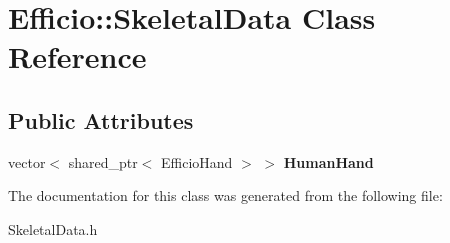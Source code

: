 \hypertarget{class_efficio_1_1_skeletal_data}{}\section{Efficio\+:\+:Skeletal\+Data Class Reference}
\label{class_efficio_1_1_skeletal_data}
\subsection*{Public Attributes}
\begin{DoxyCompactItemize}
\item 
vector$<$ shared\+\_\+ptr$<$ Efficio\+Hand $>$ $>$ {\bfseries Human\+Hand}\hypertarget{class_efficio_1_1_skeletal_data_a851f7102d47a74a365895197f8dd55ad}{}\label{class_efficio_1_1_skeletal_data_a851f7102d47a74a365895197f8dd55ad}

\end{DoxyCompactItemize}


The documentation for this class was generated from the following file\+:\begin{DoxyCompactItemize}
\item 
Skeletal\+Data.\+h\end{DoxyCompactItemize}
